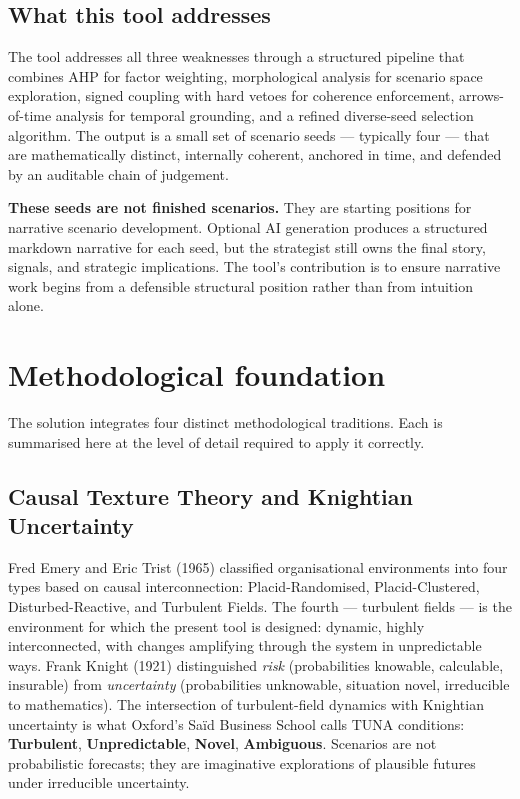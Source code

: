\documentclass[11pt,a4paper]{article}
\begin{document}
\subsection{What this tool addresses}

The tool addresses all three weaknesses through a structured pipeline that combines AHP for factor weighting, morphological analysis for scenario space exploration, signed coupling with hard vetoes for coherence enforcement, arrows-of-time analysis for temporal grounding, and a refined diverse-seed selection algorithm. The output is a small set of scenario seeds — typically four — that are mathematically distinct, internally coherent, anchored in time, and defended by an auditable chain of judgement.

\textbf{These seeds are not finished scenarios.} They are starting positions for narrative scenario development. Optional AI generation produces a structured markdown narrative for each seed, but the strategist still owns the final story, signals, and strategic implications. The tool's contribution is to ensure narrative work begins from a defensible structural position rather than from intuition alone.

\section{Methodological foundation}

The solution integrates four distinct methodological traditions. Each is summarised here at the level of detail required to apply it correctly.

\subsection{Causal Texture Theory and Knightian Uncertainty}

Fred Emery and Eric Trist (1965) classified organisational environments into four types based on causal interconnection: Placid-Randomised, Placid-Clustered, Disturbed-Reactive, and Turbulent Fields. The fourth — turbulent fields — is the environment for which the present tool is designed: dynamic, highly interconnected, with changes amplifying through the system in unpredictable ways. Frank Knight (1921) distinguished \emph{risk} (probabilities knowable, calculable, insurable) from \emph{uncertainty} (probabilities unknowable, situation novel, irreducible to mathematics). The intersection of turbulent-field dynamics with Knightian uncertainty is what Oxford's Saïd Business School calls TUNA conditions: \textbf{Turbulent}, \textbf{Unpredictable}, \textbf{Novel}, \textbf{Ambiguous}. Scenarios are not probabilistic forecasts; they are imaginative explorations of plausible futures under irreducible uncertainty.
\end{document}
